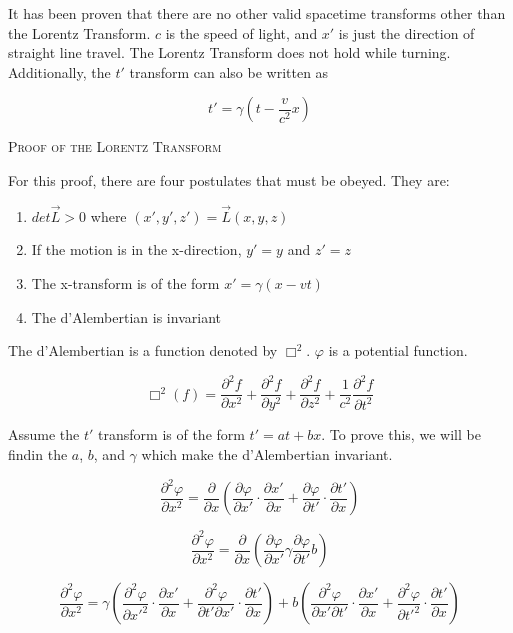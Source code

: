 \documentclass{article}
\begin{document}
It has been proven that there are no other valid spacetime transforms other than the Lorentz Transform.  $c$ is the speed of light, and $x'$ is just the direction of straight line travel.  The Lorentz Transform does not hold while turning.  Additionally, the $t'$ transform can also be written as 

\[
t' = \gamma \left(t - \frac{v}{c^2}x\right)
\]

\bigskip

\textsc{Proof of the Lorentz Transform}

For this proof, there are four postulates that must be obeyed.  They are:

\begin{enumerate}
\item $det \vec{L} > 0$ where $(x', y', z') = \vec{L}(x, y, z)$
\item If the motion is in the x-direction, $y' = y$ and $z' = z$
\item The x-transform is of the form $x' = \gamma(x - vt)$
\item The d'Alembertian is invariant
\end{enumerate}

\smallskip

The d'Alembertian is a function denoted by $\Box^2$.  $\varphi$ is a potential function.

\[
\Box^2(f) = \frac{\partial^2{f}}{\partial{x}^2} + \frac{\partial^2{f}}{\partial{y}^2} + \frac{\partial^2{f}}{\partial{z}^2} + \frac{1}{c^2}\frac{\partial^2{f}}{\partial{t}^2}
\]

Assume the $t'$ transform is of the form $t' = at + bx$.  To prove this, we will be findin the $a$, $b$, and $\gamma$ which make the d'Alembertian invariant.

\begin{equation}
\frac{\partial^2{\varphi}}{\partial{x}^2} = \frac{\partial}{\partial{x}}\left( \frac{\partial{\varphi}}{\partial{x'}}\cdot\frac{\partial{x'}}{\partial{x}} + \frac{\partial{\varphi}}{\partial{t'}}\cdot\frac{\partial{t'}}{\partial{x}} \right)
\end{equation}

\begin{equation}
\frac{\partial^2{\varphi}}{\partial{x}^2} = \frac{\partial}{\partial{x}}\left( \frac{\partial{\varphi}}{\partial{x'}}\gamma \frac{\partial{\varphi}}{\partial{t'}}b \right)
\end{equation}

\begin{equation}
\frac{\partial^2{\varphi}}{\partial{x}^2} = \gamma\left( \frac{\partial^2{\varphi}}{\partial{x'}^2}\cdot\frac{\partial{x'}}{\partial{x}} + \frac{\partial^2{\varphi}}{\partial{t'}\partial{x'}}\cdot\frac{\partial{t'}}{\partial{x}} \right) + b \left( \frac{\partial^2{\varphi}}{\partial{x'}\partial{t'}}\cdot\frac{\partial{x'}}{\partial{x}} + \frac{\partial^2{\varphi}}{\partial{t'}^2}\cdot\frac{\partial{t'}}{\partial{x}} \right)
\end{equation}
\end{document}
